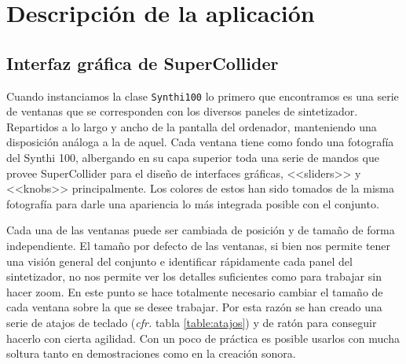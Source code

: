 \chapter{Descripción de la aplicación}
	\section{Interfaz gráfica de SuperCollider}
	Cuando instanciamos la clase \texttt{Synthi100} lo primero que encontramos es una serie de ventanas que se corresponden con los diversos paneles de sintetizador. Repartidos a lo largo y ancho de la pantalla del ordenador, manteniendo una disposición análoga a la de aquel. Cada ventana tiene como fondo una fotografía del Synthi 100, albergando en su capa superior toda una serie de mandos que provee SuperCollider para el diseño de interfaces gráficas, <<sliders>> y <<knobs>> principalmente. Los colores de estos han sido tomados de la misma fotografía para darle una apariencia lo más integrada posible con el conjunto. 
	
	Cada una de las ventanas puede ser cambiada de posición y de tamaño de forma independiente. El tamaño por defecto de las ventanas, si bien nos permite tener una visión general del conjunto e identificar rápidamente cada panel del sintetizador, no nos permite ver los detalles suficientes como para trabajar sin hacer zoom. En este punto se hace totalmente necesario cambiar el tamaño de cada ventana sobre la que se desee trabajar. Por esta razón se han creado una serie de atajos de teclado (\textit{cfr.} tabla \ref{table:atajos})  y de ratón para conseguir hacerlo con cierta agilidad. Con un poco de práctica es posible usarlos con mucha soltura tanto en demostraciones como en la creación sonora.
	

